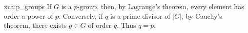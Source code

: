 
\begin{sol}{xca:p_groups}
    If $G$ is a $p$-group, then, by Lagrange's theorem, 
    every element has order a power of $p$. Conversely, 
    if $q$ is a prime divisor of $|G|$, by 
    Cauchy's theorem, there exists $g\in G$ of order $q$. Thus $q=p$.
\end{sol}


